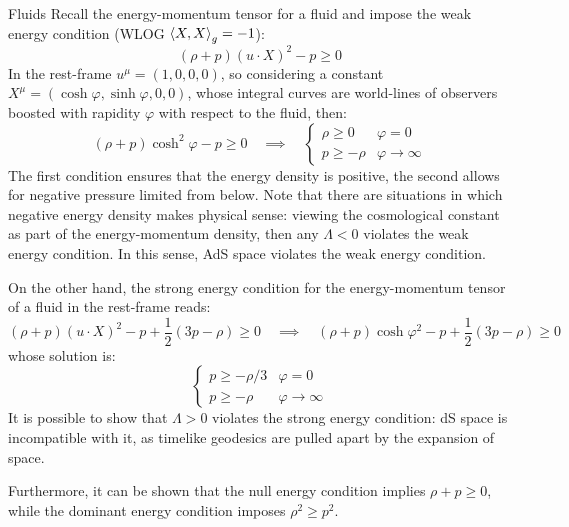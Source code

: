 \begin{example}{Fluids}{}
  Recall the energy-momentum tensor for a fluid  and impose the weak energy condition (WLOG $ \braket{X , X}_g = -1 $):
  \begin{equation*}
    (\rho + p) (u \cdot X)^2 - p \ge 0
  \end{equation*}
  In the rest-frame $ u^\mu = (1,0,0,0) $, so considering a constant $ X^\mu = (\cosh \varphi, \sinh \varphi, 0, 0) $, whose integral curves are world-lines of observers boosted with rapidity $ \varphi $ with respect to the fluid, then:
  \begin{equation*}
    (\rho + p) \cosh^2 \varphi - p \ge 0
    \quad \implies \quad
    \begin{cases}
      \rho \ge 0 & \varphi = 0 \\
      p \ge -\rho & \varphi \rightarrow \infty
    \end{cases}
  \end{equation*}
  The first condition ensures that the energy density is positive, the second allows for negative pressure limited from below.
  Note that there are situations in which negative energy density makes physical sense: viewing the cosmological constant as part of the energy-momentum density, then any $ \Lambda < 0 $ violates the weak energy condition. In this sense, AdS space violates the weak energy condition. 

  On the other hand, the strong energy condition for the energy-momentum tensor of a fluid  in the rest-frame reads:
  \begin{equation*}
    (\rho + p) (u \cdot X)^2 - p + \frac{1}{2} (3p - \rho) \ge 0
    \quad \implies \quad
    (\rho + p) \cosh \varphi^2 - p + \frac{1}{2} (3p - \rho) \ge 0
  \end{equation*}
  whose solution is:
  \begin{equation*}
    \begin{cases}
      p \ge -\rho/3 & \varphi = 0 \\
      p \ge -\rho & \varphi \rightarrow \infty
    \end{cases}
  \end{equation*}
  It is possible to show that $ \Lambda > 0 $ violates the strong energy condition: dS space is incompatible with it, as timelike geodesics are pulled apart by the expansion of space.

  Furthermore, it can be shown that the null energy condition implies $ \rho + p \geq 0 $, while the dominant energy condition imposes $ \rho^2 \geq p^2 $.
\end{example}

